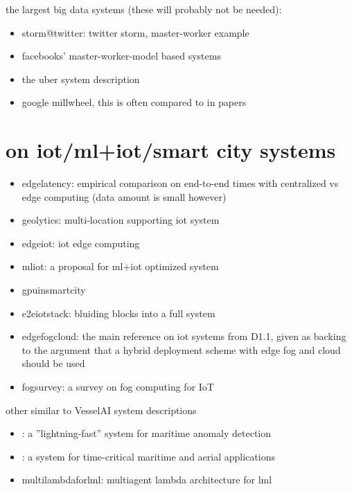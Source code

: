 \documentclass{article}
\begin{document}
the largest big data systems (these will probably not be needed):

\begin{itemize}
    \item \cite{storm@twitter} storm@twitter: twitter storm, master-worker example
    \item \cite{facebook} facebooks' master-worker-model based systems
    \item \cite{uber} the uber system description
    \item \cite{millwheel} google millwheel, this is often compared to in papers 
\end{itemize} 


\chapter{on iot/ml+iot/smart city systems}

\begin{itemize}
    \item \cite{edgelatency} edgelatency: empirical comparison on end-to-end times with centralized vs edge computing (data amount is small however)
    \item \cite{geolytics} geolytics: multi-location supporting iot system
    \item \cite{edgeiot} edgeiot: iot edge computing
    \item \cite{mliot} mliot: a proposal for ml+iot optimized system
    \item \cite{gpuinsmartcity} gpuinsmartcity
    \item \cite{e2eiotstack} e2eiotstack: bluiding blocks into a full system
    \item \cite{edgefogcloud} edgefogcloud: the main reference on iot systems from D1.1, given as backing to the argument that a hybrid deployment scheme with edge fog and cloud should be used
    \item \cite{fogsurvey} fogsurvey: a survey on fog computing for IoT
\end{itemize}

other similar to VesselAI system descriptions

\begin{itemize}
    \item \cite{anomalysystem}: a ''lightning-fast'' system for maritime anomaly detection
    \item \cite{timecriticalmarineaero}: a system for time-critical maritime and aerial applications
    \item \cite{multilambdaforlml} multilambdaforlml: multiagent lambda architecture for lml
\end{itemize}
\end{document}
